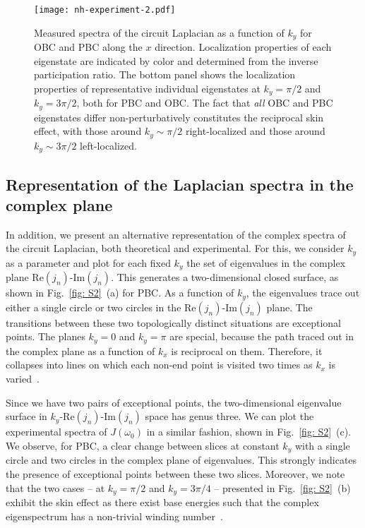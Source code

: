 \begin{figure}[!htbp]
\centering
\texttt{[image: nh-experiment-2.pdf]}
\caption[Measured spectra of the circuit Laplacian as a function of $k_y$ for OBC and PBC along the $x$ direction]{Measured spectra of the circuit Laplacian as a function of $k_y$ for OBC and PBC along the $x$ direction. Localization properties of each eigenstate are indicated by color and determined from the inverse participation ratio. The bottom panel shows the localization properties of representative individual eigenstates at $k_y = \pi /2$ and $k_y = 3 \pi /2$, both for PBC and OBC. The fact that \emph{all} OBC and PBC eigenstates differ non-perturbatively constitutes the reciprocal skin effect, with those around $k_y \sim \pi / 2$ right-localized and those around $k_y \sim 3 \pi /2$ left-localized.}
\label{fig: 2a}
\end{figure}

\subsection{Representation of the Laplacian spectra in the complex plane}
In addition, we present an alternative representation of the complex spectra of the circuit Laplacian, both theoretical and experimental. For this, we consider $k_y$ as a parameter and plot for each fixed $k_y$ the set of eigenvalues in the complex plane $\mathrm{Re}(j_n)$-$\mathrm{Im}(j_n)$. This generates a two-dimensional closed surface, as shown in Fig.~\ref{fig: S2}~(a) for PBC. As a function of $k_y$, the eigenvalues trace out either a single circle or two circles in the $\mathrm{Re}(j_n)$-$\mathrm{Im}(j_n)$ plane. The transitions between these two topologically distinct situations are exceptional points. The planes $k_y=0$ and $k_y=\pi$ are special, because the path traced out in the complex plane as a function of $k_x$ is reciprocal on them. Therefore, it collapses into lines on which each non-end point is visited two times as $k_x$ is varied~\cite{PhysRevB.99.201103}.

Since we have two pairs of exceptional points, the two-dimensional eigenvalue surface in $k_y$-$\mathrm{Re}(j_n)$-$\mathrm{Im}(j_n)$ space has genus three\cite{lee2018tidal}. We can plot the experimental spectra of $J(\omega_0)$ in a similar fashion, shown in Fig.~\ref{fig: S2}~(c). We observe, for PBC, a clear change between slices at constant $k_y$ with a single circle and two circles in the complex plane of eigenvalues. This strongly indicates the presence of exceptional points between these two slices. Moreover, we note that the two cases -- at $k_y = \pi /2$ and $k_y = 3 \pi /4$ -- presented in Fig.~\ref{fig: S2}~(b) exhibit the skin effect as there exist base energies such that the complex eigenspectrum has a non-trivial winding number~\cite{okuma2019topological, zhang2019correspondence}.

